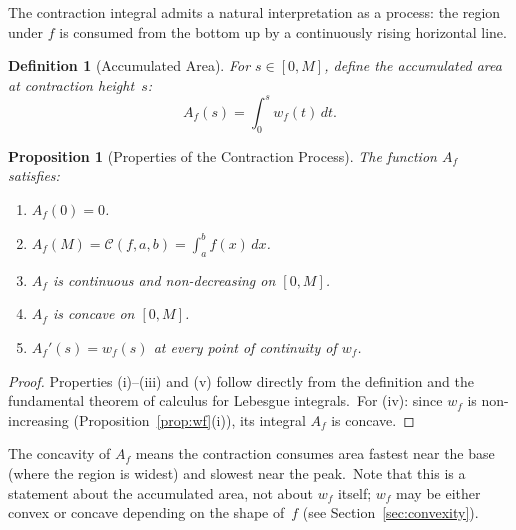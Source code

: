 \documentclass[11pt,a4paper]{article}
\newtheorem{proposition}[theorem]{Proposition}
\newtheorem{definition}[theorem]{Definition}
\begin{document}
The contraction integral admits a natural interpretation as a process: the region under $f$ is consumed from the bottom up by a continuously rising horizontal line.

\begin{definition}[Accumulated Area]\label{def:accum}
For $s\in[0,M]$, define the accumulated area at contraction height~$s$:
\[
A_f(s) = \int_0^s w_f(t)\,dt.
\]
\end{definition}

\begin{proposition}[Properties of the Contraction Process]\label{prop:process}
The function $A_f$ satisfies:
\begin{enumerate}[label=(\roman*)]
\item $A_f(0) = 0$.
\item $A_f(M) = \mathcal{C}(f,a,b) = \int_a^b f(x)\,dx$.
\item $A_f$ is continuous and non-decreasing on $[0,M]$.
\item $A_f$ is concave on $[0,M]$.
\item $A_f'(s) = w_f(s)$ at every point of continuity of $w_f$.
\end{enumerate}
\end{proposition}

\begin{proof}
Properties (i)--(iii) and (v) follow directly from the definition and the fundamental theorem of calculus for Lebesgue integrals.\ For (iv): since $w_f$ is non-increasing (Proposition~\ref{prop:wf}(i)), its integral $A_f$ is concave.
\end{proof}

The concavity of $A_f$ means the contraction consumes area fastest near the base (where the region is widest) and slowest near the peak.\ Note that this is a statement about the accumulated area, not about $w_f$ itself; $w_f$ may be either convex or concave depending on the shape of~$f$ (see Section~\ref{sec:convexity}).

\begin{center}
\end{center}
\end{document}
